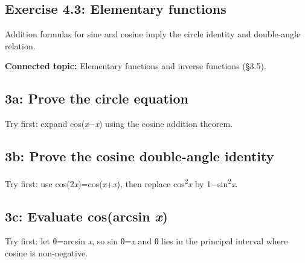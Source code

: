 \documentclass[11pt]{article}
\begin{document}
\begin{keepsection}
\section{Exercise 4.3: Elementary functions}

Addition formulas for sine and cosine imply the circle identity and double-angle relation.

\textbf{Connected topic:} Elementary functions and inverse functions (§3.5).

\begin{keepsection}
\subsection{3a: Prove the circle equation}

Try first: expand cos(\textit{x}\ensuremath{-}\textit{x}) using the cosine addition theorem.

\end{keepsection}

\begin{keepsection}
\subsection{3b: Prove the cosine double-angle identity}

Try first: use cos(2\textit{x})=cos(\textit{x}+\textit{x}), then replace cos\textsuperscript{2}\textit{x} by 1\ensuremath{-}sin\textsuperscript{2}\textit{x}.

\end{keepsection}

\begin{keepsection}
\subsection{3c: Evaluate cos(arcsin \textit{x})}

Try first: let θ=arcsin \textit{x}, so sin θ=\textit{x} and θ lies in the principal interval where cosine is non-negative.


\end{keepsection}
\end{keepsection}
\end{document}
